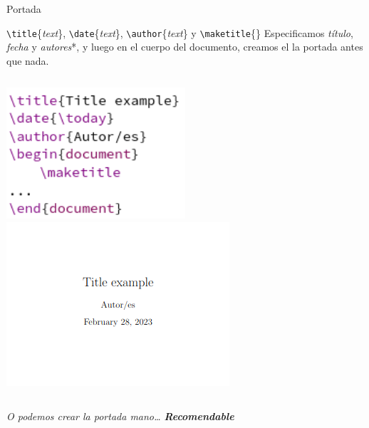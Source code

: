 \begin{frame}{Portada}

    \begin{block}{\small {\texttt{\textbackslash title}\{\textit{text}\}, \texttt{\textbackslash date}\{\textit{text}\}, \texttt{\textbackslash author}\{\textit{text}\} y \texttt{\textbackslash maketitle}\{\}}}
    Especificamos \textit{título}, \textit{fecha} y \textit{autores}*, y luego en el cuerpo del documento, creamos el la portada antes que nada.
    \end{block}

    \pause
    
    \begin{columns}
            \hspace{1.5cm}\includegraphics[width=0.5\textwidth]{images/make_title.png}
            \includegraphics[width=\textwidth]{images/make_title_res.png}
    \end{columns}

    \pause

    \centering
    \textit{O podemos crear la portada mano\ldots{} \textleftarrow\: \textbf{Recomendable}}

\end{frame}